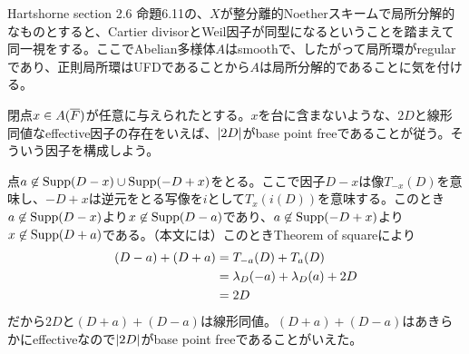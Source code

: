 \begin{rem}
Hartshorne\cite{ha} section 2.6 命題6.11の、$X$が整分離的Noetherスキームで局所分解的なものとすると、Cartier divisorとWeil因子が同型になるということを踏まえて同一視をする。ここでAbelian多様体$A$はsmoothで、したがって局所環がregularであり、正則局所環はUFDであることから$A$は局所分解的であることに気を付ける。

閉点$x \in A(\overline{F})$が任意に与えられたとする。$x$を台に含まないような、$2D$と線形同値なeffective因子の存在をいえば、$\left \lvert 2D \right \rvert$がbase point freeであることが従う。そういう因子を構成しよう。

点$a \not\in \operatorname{Supp}(D-x) \cup \operatorname{Supp}(-D + x)$をとる。ここで因子$D-x$は像$T_{-x}(D)$を意味し、$-D + x$は逆元をとる写像を$i$として$T_x(i (D))$を意味する。このとき$a \not\in \operatorname{Supp}(D-x)$より$x \not\in \operatorname{Supp}(D-a)$であり、$a \not\in \operatorname{Supp}(-D+x)$より$x \not\in \operatorname{Supp}(D + a)$である。（本文には）このときTheorem of squareにより
\begin{align*}
  (D-a) + (D+a) &= T_{-a}(D) + T_{a}(D) \\
  &= {\lambda}_{D}(-a) + {\lambda}_D(a) + 2D \\
  &= 2D
\end{align*}
だから$2D$と$(D+a) + (D-a)$は線形同値。$(D+a) + (D-a)$はあきらかにeffectiveなので$\left \lvert 2D \right \rvert$がbase point freeであることがいえた。



\end{rem}


\newpage

